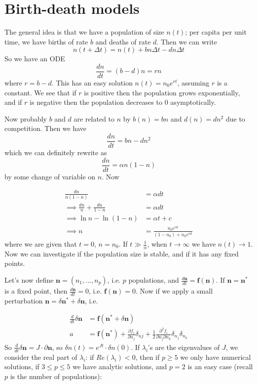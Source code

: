 \documentclass[a4paper]{article}
\begin{document}
\newpage

\section{Birth-death models}
The general idea is that we have a population of size $n(t)$; per capita per unit time, we have births of rate $b$ and deaths of rate $d$. Then we can write $$n(t+\Delta t) = n(t) + bn\Delta t - dn \Delta t$$ So we have an ODE $$\frac{dn}{dt} = (b-d)n = rn$$ where $r = b-d$. This has an easy solution $n(t) = n_0 e^{rt}$, assuming $r$ is a constant. We see that if $r$ is positive then the population grows exponentially, and if $r$ is negative then the population decreases to 0 asymptotically.

Now probably $b$ and $d$ are related to $n$ by $b(n) = bn$ and $d(n) = dn^2$ due to competition. Then we have $$\frac{dn}{dt} = bn-dn^2$$ which we can definitely rewrite as $$\frac{dn}{dt}=\alpha n(1-n)$$ by some change of variable on $n$. Now

\begin{equation*}
\begin{aligned}
\frac{dn}{n(1-n)}&=\alpha dt\\
\implies \frac{dn}{n} + \frac{dn}{1-n} &= \alpha dt\\
\implies \ln n - \ln(1-n) &= \alpha t + c\\
\implies n &= \frac{n_0 e^{\alpha t}}{(1-n_0) + n_0 e^{\alpha t}}
\end{aligned}
\end{equation*}
where we are given that $t=0$, $n=n_0$. If $t \gg \frac{1}{\alpha}$, when $t \to \infty$ we have $n(t) \to 1$. Now we can investigate if the population size is stable, and if it has any fixed points.



Let's now define $\mathbf{n} = (n_1,...,n_p)$, i.e. $p$ populations, and $\frac{d\mathbf{n}}{dt} = \mathbf{f}(\mathbf{n})$. If $\mathbf{n}=\mathbf{n}^*$ is a fixed point, then $\frac{d\mathbf{n}}{dt} = 0$, i.e. $\mathbf{f}(\mathbf{n}) = 0$. Now if we apply a small perturbation $\mathbf{n} = \delta\mathbf{n}^* + \delta \mathbf{n}$, i.e.

\begin{equation*}
\begin{aligned}
\frac{d}{dt} \delta \mathbf{n} &= \mathbf{f} (\mathbf{n}^* + \delta \mathbf{n})\\
a&= \mathbf{f} (\mathbf{n}^*) + \frac{\partial f_i}{\partial n_j} \delta_{nj} + \frac{1}{2} \frac{\partial^2 f_i} {\partial n_j \partial n_k} \delta_{n_j} \delta_{n_k}
\end{aligned}
\end{equation*}
So $\frac{d}{dt} \delta \mathbf{n} = J \cdot \partial \mathbf{n}$, so $\delta n(t) = e^{J t} \cdot \delta n(0)$. If $\lambda_i$'s are the eigenvalues of $J$, we consider the real part of $\lambda_i$: if $Re(\lambda_i)<0$, then  if $p\geq 5$ we only have numerical solutions, if $3 \leq p \leq 5$ we have analytic solutions, and $p=2$ is an easy case (recall $p$ is the number of populations):
\end{document}
